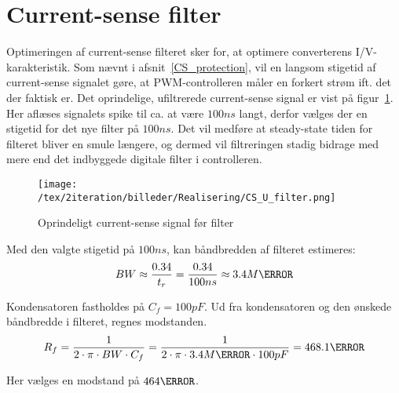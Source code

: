 
\section{Current-sense filter}
Optimeringen af current-sense filteret sker for, at optimere converterens I/V-karakteristik. Som nævnt i afsnit~\ref{CS_protection}, vil en langsom stigetid af current-sense signalet gøre, at PWM-controlleren måler en forkert strøm ift. det der faktisk er. Det oprindelige, ufiltrerede current-sense signal er vist på figur~\ref{fig:CS_U_filter}. Her aflæses signalets spike til ca. at være $100ns$ langt, derfor vælges der en stigetid for det nye filter på $100ns$. Det vil medføre at steady-state tiden for filteret bliver en smule længere, og dermed vil filtreringen stadig bidrage med mere end det indbyggede digitale filter i controlleren.

\begin{figure}[H]
	\center
	\texttt{[image: /tex/2iteration/billeder/Realisering/CS\_U\_filter.png]}
	\caption{Oprindeligt current-sense signal før filter}
	\label{fig:CS_U_filter}
\end{figure}

\noindent Med den valgte stigetid på $100ns$, kan båndbredden af filteret estimeres:
\begin{equation} \label{filter_BW}
BW \approx \frac{0.34}{t_r} = \frac{0.34}{100ns} \approx 3.4M\hertz
\end{equation}

\noindent Kondensatoren fastholdes på $C_f=100pF$. Ud fra kondensatoren og den ønskede båndbredde i filteret, regnes modstanden.
\begin{equation} \label{filter_R}
R_f = \frac{1}{2 \cdot \pi \cdot BW \cdot C_f} = \frac{1}{2 \cdot \pi \cdot 3.4M\hertz \cdot 100pF} = 468.1\ohm
\end{equation}

\noindent Her vælges en modstand på $464\ohm$.




